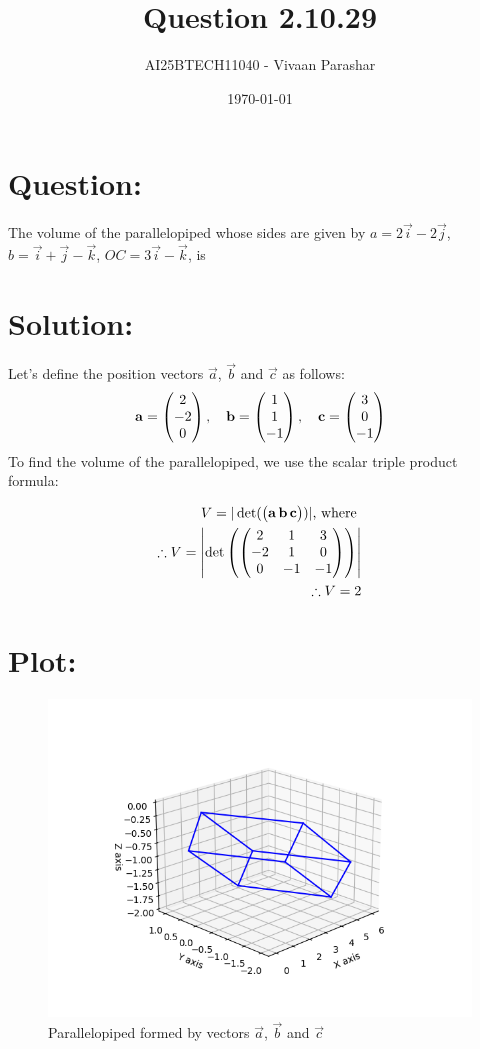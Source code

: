 \documentclass[a4paper, 12pt]{article}
\title{Question 2.10.29}
\author{AI25BTECH11040 - Vivaan Parashar}
\date{\today}
\begin{document}
\maketitle

\section{Question: }
The volume of the parallelopiped whose sides are given by $\textit{a} = 2\vec{i}-2\vec{j}$, $\textit{b} = \vec{i}+\vec{j}-\vec{k}$, $\textit{OC} = 3\vec{i} - \vec{k}$, is

\section{Solution: }
Let's define the position vectors $\vec{a}$, $\vec{b}$ and $\vec{c}$ as follows:
\begin{align}
    \mathbf{a} = \begin{pmatrix}2      \\ -2 \\ 0\end{pmatrix}, \quad
    \mathbf{b} = \begin{pmatrix}1      \\ 1 \\ -1\end{pmatrix}, \quad
    \mathbf{c} = \begin{pmatrix}3      \\ 0 \\ -1\end{pmatrix}\\
\end{align}
To find the volume of the parallelopiped, we use the scalar triple product formula:

\begin{align}
    V = |\det(\begin{pmatrix}\mathbf{a}\, \mathbf{b}\, \mathbf{c}\end{pmatrix})|\text{, where }\\
    \therefore V = \left|\det\left(\begin{pmatrix}2 & 1 & 3 \\ -2 & 1 & 0 \\ 0 & -1 & -1\end{pmatrix}\right)\right|\\
    \therefore V = 2
\end{align}

\section{Plot: }
\begin{figure}[h!]
    \centering
    \includegraphics[width=\columnwidth]{figs/plot.png}
    \caption{Parallelopiped formed by vectors $\vec{a}$, $\vec{b}$ and $\vec{c}$}
    \label{fig:2.10.29}
\end{figure}
\end{document}
